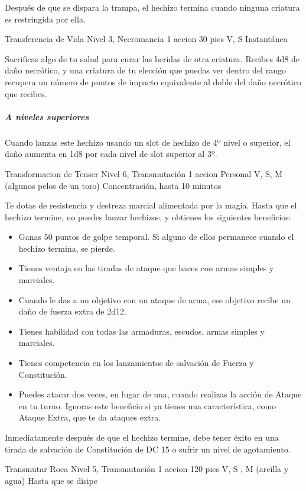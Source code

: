 \documentclass[a4paper,twocolumn,openany,10pt]{dndbook}
\begin{document}
	Después de que se dispara la trampa, el hechizo termina cuando ninguna criatura es restringida por ella. 

\spellheader%
	{Transferencia de Vida}
	{Nivel 3, Necromancia}
	{1 accion}
	{30 pies}
	{V, S}
	{Instantánea}
	
	Sacrificas algo de tu salud para curar las heridas de otra criatura. Recibes 4d8 de daño necrótico, y una criatura de tu
	elección que puedas ver dentro del rango recupera un número de puntos de impacto equivalente al doble del daño necrótico que
	recibes.

	\subparagraph{A niveles superiores} Cuando lanzas este hechizo usando un slot de hechizo de 4º nivel o superior, el daño
	aumenta en 1d8 por cada nivel de slot superior al 3º.

\spellheader%
	{Transformacion de Tenser}
	{Nivel 6, Transmutación}
	{1 accion}
	{Personal}
	{V, S, M (algunos pelos de un toro)}
	{Concentración, hasta 10 minutos}
	
	Te dotas de resistencia y destreza marcial alimentada por la magia. Hasta que el hechizo termine, no puedes lanzar hechizos,
	y obtienes los siguientes beneficios:
	
	\begin{itemize}
		\item Ganas 50 puntos de golpe temporal. Si alguno de ellos permanece cuando el hechizo termina, se pierde.
		\item Tienes ventaja en las tiradas de ataque que haces con armas simples y marciales.
		\item Cuando le das a un objetivo con un ataque de arma, ese objetivo recibe un daño de fuerza extra de 2d12.
		\item Tienes habilidad con todas las armaduras, escudos, armas simples y marciales.
		\item Tienes competencia en los lanzamientos de salvación de Fuerza y Constitución.
		\item Puedes atacar dos veces, en lugar de una, cuando realizas la acción de Ataque en tu turno. Ignoras este beneficio
		si ya tienes una característica, como Ataque Extra, que te da ataques extra.
	\end{itemize}
	
	Inmediatamente después de que el hechizo termine, debe tener éxito en una tirada de salvación de Constitución de DC 15 o
	sufrir un nivel de agotamiento. 

\spellheader%
	{Transmutar Roca}
	{Nivel 5, Transmutación}
	{1 accion}
	{120 pies}
	{V, S , M (arcilla y agua)}
	{Hasta que se disipe}
\end{document}
